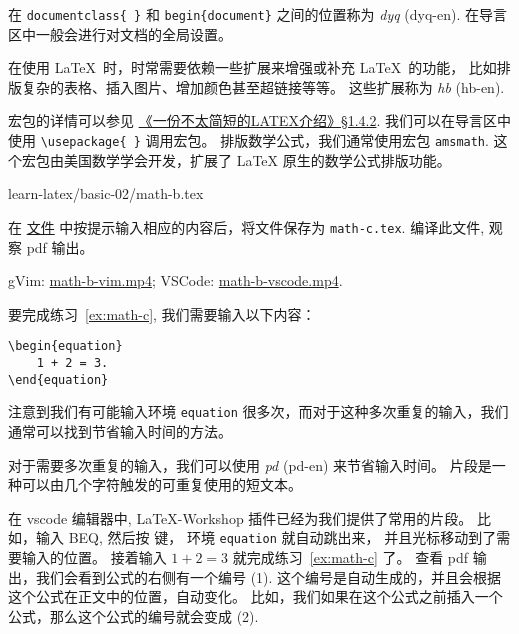 \documentclass[
    11pt,
    base=hide,
    cite=authoryear,
    device=phone,
    lang=cn,
    mode=simple,
    result=answer,
    toc=onecol,
]{elegantbook_sierxue}
\begin{document}
\begin{latex}\label{tex:preamble}
    在 \lstinline|documentclass{ }| 和
    \lstinline|begin{document}| 之间的位置称为
    \emph{\gls{dyq}} (\gls{dyq-en}).
    在导言区中一般会进行对文档的全局设置。
\end{latex}
\begin{latex}\label{tex:package}
    在使用 \LaTeX\ 时，时常需要依赖一些扩展来增强或补充 \LaTeX\ 的功能，
    比如排版复杂的表格、插入图片、增加颜色甚至超链接等等。
    这些扩展称为
    \emph{\gls{hb}} (\gls{hb-en}).
\end{latex}
宏包的详情可以参见 \hyperlink{books/lshort-zh-cn.pdf.18}%
{《一份不太简短的LATEX介绍》\S1.4.2}.
我们可以在导言区中使用 \lstinline|\usepackage{ }| 调用宏包。
排版数学公式，我们通常使用宏包 \texttt{amsmath}.
这个宏包由美国数学学会开发，扩展了 {\LaTeX} 原生的数学公式排版功能。

%
{learn-latex/basic-02/math-b.tex}
\begin{exercise}\label{ex:math-c}
    在 \href{learn-latex/basic-02/math-b.tex}{文件}
    中按提示输入相应的内容后，将文件保存为 \texttt{math-c.tex}.
    编译此文件, 观察 pdf 输出。
\end{exercise}
\begin{cast}\label{cast:math-b}
    gVim: \href{media/casts/math-b.mp4}{math-b-vim.mp4};
    VSCode: \href{media/casts/math-b.mp4}{math-b-vscode.mp4}.
\end{cast}
要完成练习~\ref{ex:math-c}, 我们需要输入以下内容：
\begin{lstlisting}[style=lst]
\begin{equation}
    1 + 2 = 3.
\end{equation}
\end{lstlisting}
注意到我们有可能输入环境 \texttt{equation}
很多次，而对于这种多次重复的输入，我们通常可以找到节省输入时间的方法。
\begin{share}\label{share:snippets}
    对于需要多次重复的输入，我们可以使用
    \emph{\gls{pd}} (\gls{pd-en}) 来节省输入时间。
    片段是一种可以由几个字符触发的可重复使用的短文本。
\end{share}
在 vscode 编辑器中, LaTeX-Workshop 插件已经为我们提供了常用的片段。
比如，输入 BEQ, 然后按  键，
环境 \texttt{equation} 就自动跳出来，
并且光标移动到了需要输入的位置。
接着输入 \(1 + 2 = 3\) 就完成练习~\ref{ex:math-c} 了。
查看 pdf 输出，我们会看到公式的右侧有一个编号 (1).
这个编号是自动生成的，并且会根据这个公式在正文中的位置，自动变化。
比如，我们如果在这个公式之前插入一个公式，那么这个公式的编号就会变成 (2).
\end{document}
